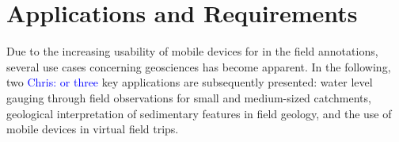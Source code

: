 \documentclass[review]{elsarticle}
\begin{document}

\section{Applications and Requirements}
\label{sec:applications}
Due to the increasing usability of mobile devices for in the field annotations, several use cases concerning geosciences has become apparent. In the following, two \textcolor{blue}{Chris: or three} key applications are subsequently presented: water level gauging through field observations for small and medium-sized catchments, geological interpretation of sedimentary features in field geology, and the use of mobile devices in virtual field trips.
\end{document}
